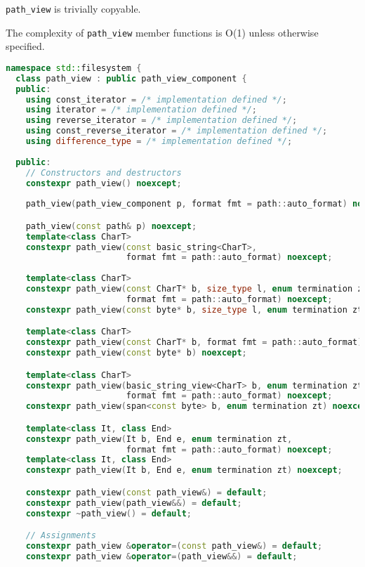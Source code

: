 \documentclass[11pt]{article}
\newcommand{\code}[2][cpp]{\lstinline[language=#1,basicstyle=\small\ttfamily]{#2}}
\begin{document}
\code{path_view} is trivially copyable.

The complexity of \code{path_view} member functions is O(1) unless otherwise specified.

\begin{lstlisting}[language=cpp]
namespace std::filesystem {
  class path_view : public path_view_component {
  public:
    using const_iterator = /* implementation defined */;
    using iterator = /* implementation defined */;
    using reverse_iterator = /* implementation defined */;
    using const_reverse_iterator = /* implementation defined */;
    using difference_type = /* implementation defined */;
    
  public:
    // Constructors and destructors
    constexpr path_view() noexcept;
    
    path_view(path_view_component p, format fmt = path::auto_format) noexcept;

    path_view(const path& p) noexcept;
    template<class CharT>
    constexpr path_view(const basic_string<CharT>,
                        format fmt = path::auto_format) noexcept;
                        
    template<class CharT>
    constexpr path_view(const CharT* b, size_type l, enum termination zt,
                        format fmt = path::auto_format) noexcept;
    constexpr path_view(const byte* b, size_type l, enum termination zt) noexcept;

    template<class CharT>
    constexpr path_view(const CharT* b, format fmt = path::auto_format) noexcept;
    constexpr path_view(const byte* b) noexcept;

    template<class CharT>
    constexpr path_view(basic_string_view<CharT> b, enum termination zt,
                        format fmt = path::auto_format) noexcept;
    constexpr path_view(span<const byte> b, enum termination zt) noexcept;

    template<class It, class End>
    constexpr path_view(It b, End e, enum termination zt,
                        format fmt = path::auto_format) noexcept;
    template<class It, class End>
    constexpr path_view(It b, End e, enum termination zt) noexcept;

    constexpr path_view(const path_view&) = default;
    constexpr path_view(path_view&&) = default;
    constexpr ~path_view() = default;

    // Assignments
    constexpr path_view &operator=(const path_view&) = default;
    constexpr path_view &operator=(path_view&&) = default;
    

\end{lstlisting}
\end{document}
